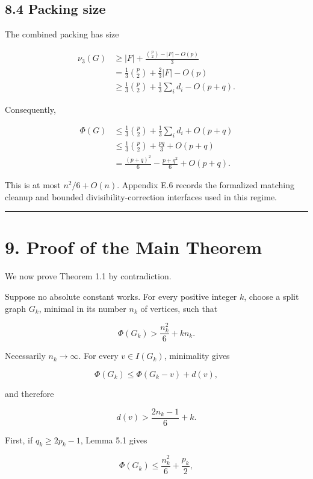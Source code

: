 \documentclass[english,11pt,a4paper]{article}
\begin{document}
\subsection{8.4 Packing size}\label{packing-size}

The combined packing has size

\[
\begin{aligned}
\nu_3(G)
&\ge
|F|+\frac{\binom p2-|F|-O(p)}3\\
&=
\frac13\binom p2+\frac23|F|-O(p)\\
&\ge
\frac13\binom p2+\frac13\sum_i d_i-O(p+q).
\end{aligned}
\tag{8.10}
\]

Consequently,

\[
\begin{aligned}
\Phi(G)
&\le
\frac13\binom p2+\frac13\sum_i d_i+O(p+q)\\
&\le
\frac13\binom p2+\frac{pq}{3}+O(p+q)\\
&=
\frac{(p+q)^2}{6}-\frac{p+q^2}{6}+O(p+q).
\end{aligned}
\tag{8.11}
\]

This is at most \(n^2/6+O(n)\). Appendix E.6 records the formalized
matching cleanup and bounded divisibility-correction interfaces used in
this regime.

\begin{center}\rule{0.5\linewidth}{0.5pt}\end{center}

\section{9. Proof of the Main Theorem}\label{proof-of-the-main-theorem}

We now prove Theorem 1.1 by contradiction.

Suppose no absolute constant works. For every positive integer \(k\),
choose a split graph \(G_k\), minimal in its number \(n_k\) of vertices,
such that

\[
\Phi(G_k)
>
\frac{n_k^2}{6}+kn_k.
\tag{9.1}
\]

Necessarily \(n_k\to\infty\). For every \(v\in I(G_k)\), minimality
gives

\[
\Phi(G_k)
\le
\Phi(G_k-v)+d(v),
\]

and therefore

\[
\boxed{
d(v)>
\frac{2n_k-1}{6}+k
}.
\tag{9.2}
\]

First, if \(q_k\ge2p_k-1\), Lemma 5.1 gives

\[
\Phi(G_k)
\le
\frac{n_k^2}{6}+\frac{p_k}{2},
\]
\end{document}
